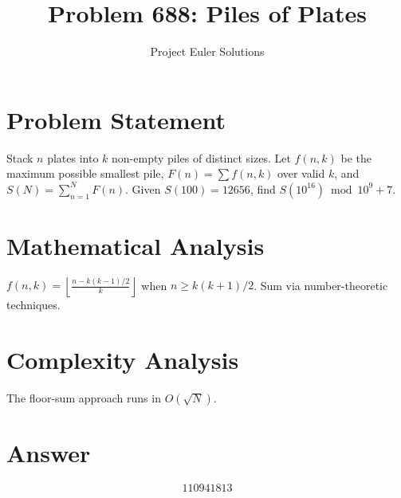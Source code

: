 \documentclass[11pt]{article}
\title{Problem 688: Piles of Plates}
\author{Project Euler Solutions}
\date{}
\begin{document}
\maketitle

\section{Problem Statement}

Stack $n$ plates into $k$ non-empty piles of distinct sizes. Let $f(n,k)$ be the maximum possible smallest pile, $F(n)=\sum f(n,k)$ over valid $k$, and $S(N)=\sum_{n=1}^{N} F(n)$. Given $S(100)=12656$, find $S(10^{16})\bmod 10^9+7$.

\section{Mathematical Analysis}

$f(n,k) = \left\lfloor \frac{n - k(k-1)/2}{k} \right\rfloor$ when $n \ge k(k+1)/2$. Sum via number-theoretic techniques.

\section{Complexity Analysis}

The floor-sum approach runs in $O(\sqrt{N})$.

\section{Answer}

\[
\boxed{110941813}
\]
\end{document}
